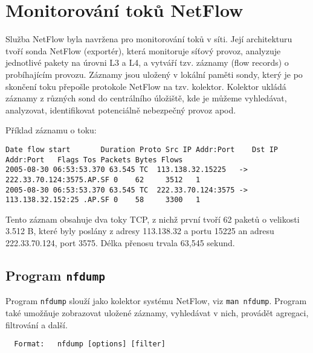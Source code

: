  \newpage
\section{Monitorování toků NetFlow}\label{netflow}
Služba NetFlow byla navržena pro monitorování toků v síti. Její architekturu tvoří sonda NetFlow (exportér), která monitoruje síťový provoz, analyzuje jednotlivé pakety na úrovni L3 a L4, a vytváří tzv. záznamy (flow records) o probíhajícím provozu. Záznamy jsou uložený v lokální paměti sondy, který je po skončení toku přepošle protokole NetFlow na tzv. kolektor. Kolektor ukládá záznamy z různých sond do centrálního úložiště, kde je můžeme vyhledávat, analyzovat, identifikovat potenciálně nebezpečný provoz apod.

Příklad záznamu o toku:
{\footnotesize
\begin{verbatim}
Date flow start       Duration Proto Src IP Addr:Port    Dst IP Addr:Port   Flags Tos Packets Bytes Flows
2005-08-30 06:53:53.370 63.545 TC  113.138.32.15225   ->  222.33.70.124:3575.AP.SF 0    62     3512   1
2005-08-30 06:53:53.370 63.545 TC  222.33.70.124:3575 ->  113.138.32.152:25 .AP.SF 0    58     3300   1
\end{verbatim}
}
Tento záznam obsahuje dva toky TCP, z nichž první tvoří 62 paketů o velikosti 3.512 B, které byly poslány z adresy 113.138.32 a portu 15225 an adresu 222.33.70.124, port 3575. Délka přenosu trvala 63,545 sekund. 


\subsection{Program {\tt nfdump}}
Program {\tt nfdump} slouží jako kolektor systému NetFlow, viz {\tt man nfdump}. Program také umožňuje zobrazovat uložené záznamy, vyhledávat v nich, provádět agregaci, filtrování a další. 

\begin{verbatim}
  Format:   nfdump [options] [filter] 
\end{verbatim}

